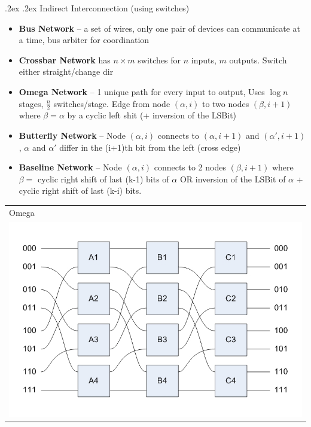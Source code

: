 \documentclass[10pt,landscape,a4paper]{article}
\makeatletter
\renewcommand{\subsubsection}{\@startsection{subsubsection}{1}{0mm}%
  {.2ex}%
  {.2ex}%
{\rmfamily\bfseries}}
\makeatother
\begin{document}
\begin{multicols*}{4}
  \subsubsection{Indirect Interconnection (using switches)}
  \begin{itemize}
    \item \textbf{Bus Network} -- a set of wires, only one pair of devices can communicate at a time, bus arbiter for coordination
    \item \textbf{Crossbar Network} has $n\times m$ switches for $n$ inputs, $m$ outputs. Switch either straight/change dir
    \item \textbf{Omega Network} -- 1 unique path for every input to output, Uses $\log n$ stages, $\frac{n}{2}$ switches/stage. Edge from node $(\alpha, i)$ to two nodes $(\beta, i + 1)$ where $\beta = \alpha$ by a cyclic left shit (+ inversion of the LSBit)
    \item \textbf{Butterfly Network} -- Node $(\alpha, i)$ connects to $(\alpha, i + 1)$ and $(\alpha', i + 1)$, $\alpha$ and $\alpha'$ differ in the (i+1)th bit from the left (cross edge)
    \item \textbf{Baseline Network} -- Node $(\alpha, i)$ connects to 2 nodes $(\beta, i + 1)$ where $\beta = $ cyclic right shift of last (k-1) bits of $\alpha$ OR inversion of the LSBit of $\alpha$ + cyclic right shift of last (k-i) bits.
  \end{itemize}
  \begin{tabularx}{0.32\linewidth}{X}
    Omega\\
    \includegraphics[width=\linewidth]{omega}
  \end{tabularx}
  \begin{tabularx}{0.32\linewidth}{X}

\end{tabularx}
\end{multicols*}
\end{document}
